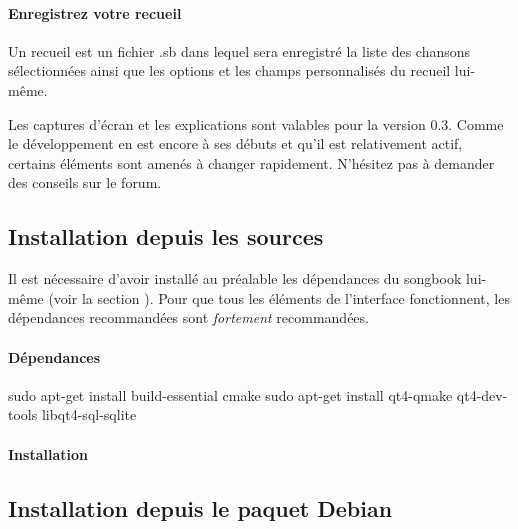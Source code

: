 \documentclass[versionenligne]{patacrep}
\begin{document}
\paragraph{Enregistrez votre recueil}
Un recueil est un fichier .sb dans lequel sera enregistré la liste des
chansons sélectionnées ainsi que les options et les champs
personnalisés du recueil lui-même.


\begin{nota} 
  Les captures d'écran et les explications sont valables pour la
  version 0.3. Comme le développement en est encore à ses débuts et
  qu'il est relativement actif, certains éléments sont amenés à
  changer rapidement. N'hésitez pas à demander des conseils sur le
  forum.
\end{nota}

\subsection{Installation depuis les sources}

\begin{nota}
  Il est nécessaire d'avoir installé au préalable les dépendances du
  songbook lui-même (voir la section
  ). Pour que tous les éléments
  de l'interface fonctionnent, les dépendances recommandées sont
  \emph{fortement} recommandées.
\end{nota}

\paragraph{Dépendances}
\begin{unixcom}
  sudo apt-get install build-essential cmake
  sudo apt-get install qt4-qmake qt4-dev-tools libqt4-sql-sqlite
\end{unixcom}

\paragraph{Installation}
\subsection{Installation depuis le paquet Debian}
\end{document}
